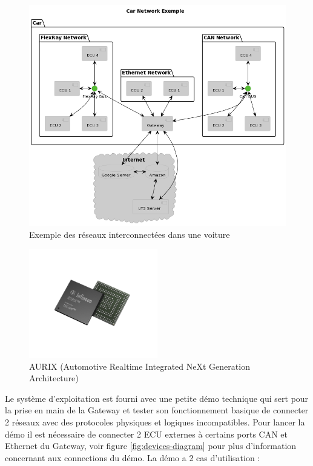 \begin{figure}[!htb]
 \centering
 \includegraphics[width=\textwidth]{img/gateway_car.png}
 \caption{Exemple des réseaux interconnect\'ees dans une voiture}
 \label{fig:gw-car}
\end{figure}

\begin{figure}[!htb]
 \centering
 \includegraphics[width=0.5\textwidth]{img/Aurix.png}
 \caption{AURIX (Automotive Realtime Integrated NeXt Generation Architecture)}
 \label{fig:aurix-photo}
\end{figure}

Le système d'exploitation est fourni avec une petite démo technique qui sert pour la prise en main de la Gateway et tester son fonctionnement basique de connecter 2 réseaux avec des protocoles physiques et logiques incompatibles. Pour lancer la démo il est nécessaire de connecter 2 ECU externes \`a certains ports CAN et Ethernet du Gateway, voir figure \ref{fig:devices-diagram} pour plus d'information concernant aux connections du d\'emo. La démo a 2 cas d'utilisation : 

